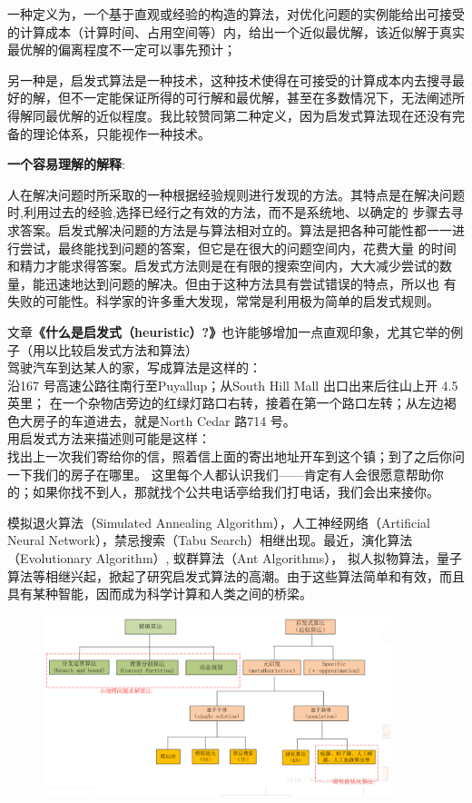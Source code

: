\documentclass[11pt,a4paper,oneside]{book}
\begin{document}
一种定义为，一个基于直观或经验的构造的算法，对优化问题的实例能给出可接受的计算成本（计算时间、占用空间等）内，给出一个近似最优解，该近似解于真实最优解的偏离程度不一定可以事先预计；

另一种是，启发式算法是一种技术，这种技术使得在可接受的计算成本内去搜寻最好的解，但不一定能保证所得的可行解和最优解，甚至在多数情况下，无法阐述所得解同最优解的近似程度。我比较赞同第二种定义，因为启发式算法现在还没有完备的理论体系，只能视作一种技术。

\textbf{一个容易理解的解释}:

人在解决问题时所采取的一种根据经验规则进行发现的方法。其特点是在解决问题时,利用过去的经验,选择已经行之有效的方法，而不是系统地、以确定的 步骤去寻求答案。启发式解决问题的方法是与算法相对立的。算法是把各种可能性都一一进行尝试，最终能找到问题的答案，但它是在很大的问题空间内，花费大量 的时间和精力才能求得答案。启发式方法则是在有限的搜索空间内，大大减少尝试的数量，能迅速地达到问题的解决。但由于这种方法具有尝试错误的特点，所以也 有失败的可能性。科学家的许多重大发现，常常是利用极为简单的启发式规则。
\begin{tcolorbox}[colback=black!5!white,colframe=black!60!]
文章\textbf{《什么是启发式（heuristic）?》}也许能够增加一点直观印象，尤其它举的例子（用以比较启发式方法和算法）
\\

驾驶汽车到达某人的家，写成算法是这样的：\\
沿167 号高速公路往南行至Puyallup；从South Hill Mall 出口出来后往山上开 4.5 英里； 在一个杂物店旁边的红绿灯路口右转，接着在第一个路口左转；从左边褐色大房子的车道进去，就是North Cedar 路714 号。
\\

用启发式方法来描述则可能是这样：\\
找出上一次我们寄给你的信，照着信上面的寄出地址开车到这个镇；到了之后你问一下我们的房子在哪里。 这里每个人都认识我们——肯定有人会很愿意帮助你的；如果你找不到人，那就找个公共电话亭给我们打电话，我们会出来接你。
\end{tcolorbox}

模拟退火算法（Simulated Annealing Algorithm），人工神经网络（Artificial Neural Network），禁忌搜索（Tabu Search）相继出现。最近，演化算法（Evolutionary Algorithm）, 蚁群算法（Ant Algorithms）， 拟人拟物算法，量子算法等相继兴起，掀起了研究启发式算法的高潮。由于这些算法简单和有效，而且具有某种智能，因而成为科学计算和人类之间的桥梁。
\begin{figure}[H]
	\centering
	\includegraphics[width=0.9\textwidth]{7.png}
\end{figure}
\end{document}
